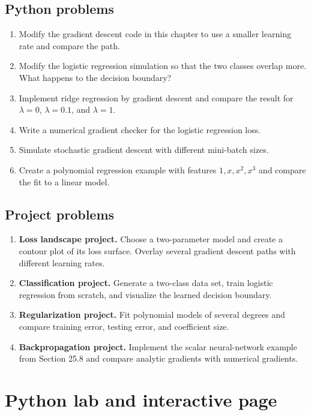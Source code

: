 \documentclass[11pt,oneside]{book}
\begin{document}
\subsection*{Python problems}
\begin{enumerate}[start=15]
  \item Modify the gradient descent code in this chapter to use a smaller learning rate and compare the path.
  \item Modify the logistic regression simulation so that the two classes overlap more. What happens to the decision boundary?
  \item Implement ridge regression by gradient descent and compare the result for $\lambda=0$, $\lambda=0.1$, and $\lambda=1$.
  \item Write a numerical gradient checker for the logistic regression loss.
  \item Simulate stochastic gradient descent with different mini-batch sizes.
  \item Create a polynomial regression example with features $1,x,x^2,x^3$ and compare the fit to a linear model.
\end{enumerate}

\subsection*{Project problems}
\begin{enumerate}[start=21]
  \item \textbf{Loss landscape project.} Choose a two-parameter model and create a contour plot of its loss surface. Overlay several gradient descent paths with different learning rates.
  \item \textbf{Classification project.} Generate a two-class data set, train logistic regression from scratch, and visualize the learned decision boundary.
  \item \textbf{Regularization project.} Fit polynomial models of several degrees and compare training error, testing error, and coefficient size.
  \item \textbf{Backpropagation project.} Implement the scalar neural-network example from Section 25.8 and compare analytic gradients with numerical gradients.
\end{enumerate}

\section{Python lab and interactive page}
\end{document}
